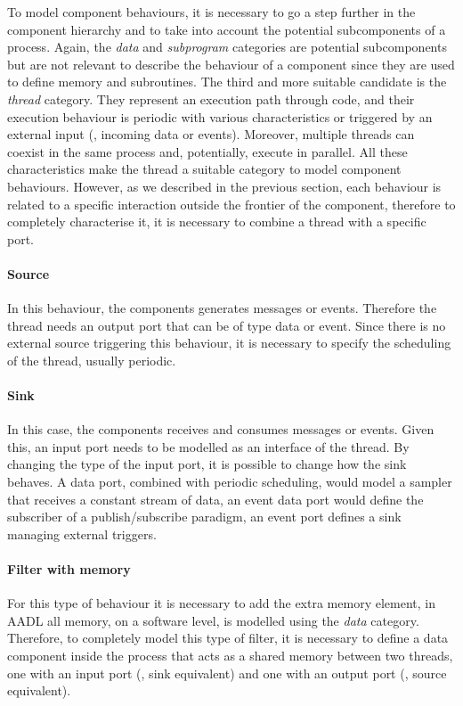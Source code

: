 To model component behaviours, it is necessary to go a step further in the component hierarchy and to take into account the potential subcomponents of a process. Again, the \textit{data} and \textit{subprogram} categories are potential subcomponents but are not relevant to describe the behaviour of a component since they are used to define memory and subroutines. The third and more suitable candidate is the \textit{thread} category. They represent an execution path through code, and their execution behaviour is periodic with various characteristics or triggered by an external input (\eg, incoming data or events). Moreover, multiple threads can coexist in the same process and, potentially, execute in parallel. All these characteristics make the thread a suitable category to model component behaviours. However, as we described in the previous section, each behaviour is related to a specific interaction outside the frontier of the component, therefore to completely characterise it, it is necessary to combine a thread with a specific port.
\paragraph{Source} In this behaviour, the components generates messages or events. Therefore the thread needs an output port that can be of type data or event. Since there is no external source triggering this behaviour, it is necessary to specify the scheduling of the thread, usually periodic.
\paragraph{Sink} In this case, the components receives and consumes messages or events. Given this, an input port needs to be modelled as an interface of the thread. By changing the type of the input port, it is possible to change how the sink behaves. A data port, combined with periodic scheduling, would model a sampler that receives a constant stream of data, an event data port would define the subscriber of a publish/subscribe paradigm, an event port defines a sink managing external triggers.
\paragraph{Filter with memory} For this type of behaviour it is necessary to add the extra memory element, in AADL all memory, on a software level, is modelled using the \textit{data} category. Therefore, to completely model this type of filter, it is necessary to define a data component inside the process that acts as a shared memory between two threads, one with an input port (\ie, sink equivalent) and one with an output port (\ie, source equivalent).
